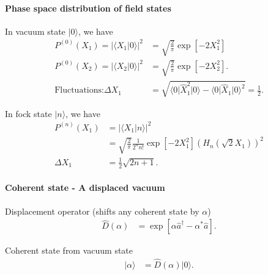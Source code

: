 \documentclass[../../note.tex]{subfiles}
\begin{document}
\paragraph{Phase space distribution of field states}
\begin{lemma}
    In vacuum state $\vert 0 \rangle$, we have
    \begin{align}
        P^{(0)}(X_1) = \vert \langle X_1 \vert 0 \rangle \vert^2 
        &= \sqrt{\frac{2}{\pi}} \exp\left[-2 X_1^2\right] \\
        P^{(0)}(X_2) = \vert \langle X_2 \vert 0 \rangle \vert^2 
        &= \sqrt{\frac{2}{\pi}} \exp\left[-2 X_2^2\right].\\
        \textrm{Fluctuations:} \Delta X_1
        &= \sqrt{\langle 0 \vert \hat{X}_1^2\vert 0 \rangle - \langle 0 \vert \hat{X}_1 \vert 0 \rangle^2} = \frac{1}{2}.
    \end{align}
\end{lemma}

\begin{lemma}
    In fock state $\vert n \rangle$, we have
    \begin{align}
        P^{(n)}(X_1)
        &= \vert \langle X_1 \vert n \rangle \vert^2 \\
        &= \sqrt{\frac{2}{\pi}} \frac{1}{2^n n!} \exp\left[-2 X_1^2 \right] \left(H_n(\sqrt{2} X_1)\right)^2\\
        \Delta X_1
        &= \frac{1}{2} \sqrt{2 n + 1}.
    \end{align}
\end{lemma}

\paragraph{Coherent state - A displaced vacuum}
\begin{definition}
    Displacement operator (shifts any coherent state by $\alpha$)
    \begin{align}
        \hat{D}(\alpha)
        &= \exp\left[\alpha \hat{a}^\dagger - \alpha^\ast \hat{a}\right].
    \end{align}
\end{definition}

\begin{corollary}
    Coherent state from vacuum state
    \begin{align}
        \vert \alpha \rangle
        &= \hat{D}(\alpha) \vert 0 \rangle.
    \end{align}
\end{corollary}
\end{document}

